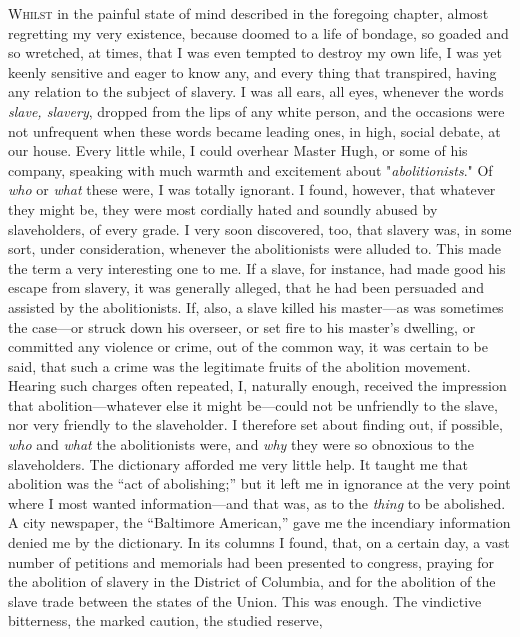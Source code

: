 \textsc{Whilst} in the painful state of mind described in the foregoing
chapter, almost regretting my very existence, because doomed to a life
of bondage, so goaded and so wretched, at times, that I was even tempted
to destroy my own life, I was yet keenly sensitive and eager to know
any, and every thing that transpired, having any relation to the subject
of slavery. I was all ears, all eyes, whenever the words \emph{slave,
slavery}, dropped from the lips of any white person, and the occasions
were not unfrequent when these words became leading ones, in high,
social debate, at our house. Every little while, I could overhear Master
Hugh, or some of his company, speaking with much warmth and excitement
about "\emph{abolitionists}." Of \emph{who} or \emph{what} these were, I
was totally ignorant. I found, however, that whatever they might be,
they were most {\protect\hypertarget{164}{}{}}cordially hated and
soundly abused by slaveholders, of every grade. I very soon discovered,
too, that slavery was, in some sort, under consideration, whenever the
abolitionists were alluded to. This made the term a very interesting one
to me. If a slave, for instance, had made good his escape from slavery,
it was generally alleged, that he had been persuaded and assisted by the
abolitionists. If, also, a slave killed his master---as was sometimes
the case---or struck down his overseer, or set fire to his master's
dwelling, or committed any violence or crime, out of the common way, it
was certain to be said, that such a crime was the legitimate fruits of
the abolition movement. Hearing such charges often repeated, I,
naturally enough, received the impression that abolition---whatever else
it might be---could not be unfriendly to the slave, nor very friendly to
the slaveholder. I therefore set about finding out, if possible,
\emph{who} and \emph{what} the abolitionists were, and \emph{why} they
were so obnoxious to the slaveholders. The dictionary afforded me very
little help. It taught me that abolition was the ``act of abolishing;''
but it left me in ignorance at the very point where I most wanted
information---and that was, as to the \emph{thing} to be abolished. A
city newspaper, the ``Baltimore American,'' gave me the incendiary
information denied me by the dictionary. In its columns I found, that,
on a certain day, a vast number of petitions and memorials had been
presented to congress, praying for the abolition of slavery in the
District of Columbia, and for the abolition of the slave trade between
the states of the Union. This was enough. The vindictive bitterness,
{\protect\hypertarget{165}{}{}}the marked caution, the studied reserve,

